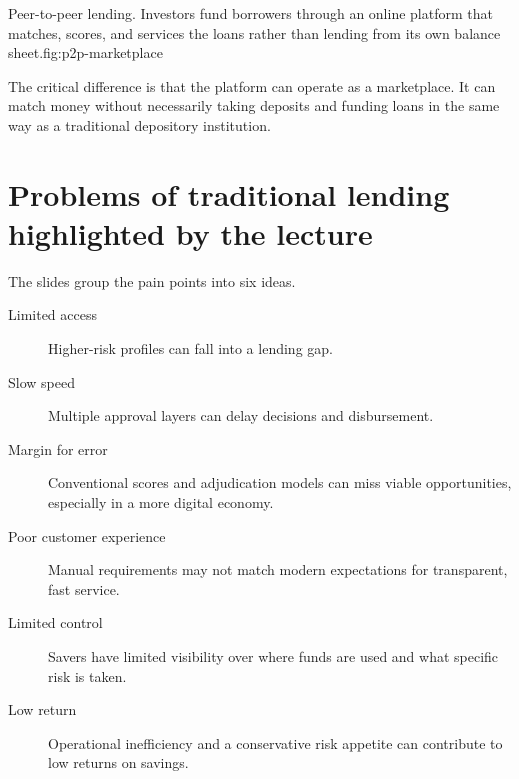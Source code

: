\begin{utpfig}{Peer-to-peer lending. Investors fund borrowers through an online platform that matches, scores, and services the loans rather than lending from its own balance sheet.}{fig:p2p-marketplace}
\end{utpfig}

The critical difference is that the platform can operate as a marketplace. It can match money without necessarily taking deposits and funding loans in the same way as a traditional depository institution.

\section{Problems of traditional lending highlighted by the lecture}

The slides group the pain points into six ideas.

\begin{description}
  \item[Limited access] Higher-risk profiles can fall into a lending gap.
  \item[Slow speed] Multiple approval layers can delay decisions and disbursement.
  \item[Margin for error] Conventional scores and adjudication models can miss viable opportunities, especially in a more digital economy.
  \item[Poor customer experience] Manual requirements may not match modern expectations for transparent, fast service.
  \item[Limited control] Savers have limited visibility over where funds are used and what specific risk is taken.
  \item[Low return] Operational inefficiency and a conservative risk appetite can contribute to low returns on savings.
\end{description}

